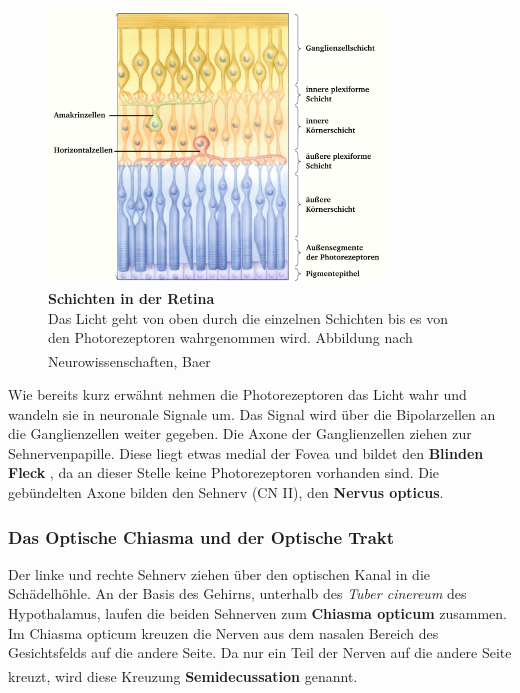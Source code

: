 \documentclass[12pt,a4paper,pdftex]{article}
\begin{document}
\begin{figure}[H]
    \centering
    \includegraphics[width = 0.8\textwidth]{pictures/visual/retina.png}
    \caption[Schichten in der Retina]{\textbf{Schichten in der Retina}\\
    Das Licht geht von oben durch die einzelnen Schichten bis es von den Photorezeptoren wahrgenommen wird. Abbildung nach Neurowissenschaften, Baer \textsuperscript{\cite[10]{neurowissenschaften_baer}}}
    \label{fig:retina}
\end{figure}

Wie bereits kurz erwähnt nehmen die Photorezeptoren das Licht wahr und wandeln sie in neuronale Signale um. Das Signal wird über die Bipolarzellen an die Ganglienzellen weiter gegeben. Die Axone der Ganglienzellen ziehen zur Sehnervenpapille. Diese liegt etwas medial der Fovea und bildet den \textbf{Blinden Fleck} , da an dieser Stelle keine Photorezeptoren vorhanden sind. Die gebündelten Axone bilden den Sehnerv (CN II), den \textbf{Nervus opticus}.  


\subsubsection*{Das Optische Chiasma und der Optische Trakt}


Der linke und rechte Sehnerv ziehen über den optischen Kanal in die Schädelhöhle. An der Basis des Gehirns, unterhalb des \textit{Tuber cinereum} des Hypothalamus, laufen die beiden Sehnerven zum \textbf{Chiasma opticum}  zusammen. 
Im Chiasma opticum kreuzen die Nerven aus dem nasalen Bereich des Gesichtsfelds auf die andere Seite. Da nur ein Teil der Nerven auf die andere Seite kreuzt, wird diese Kreuzung \textbf{Semidecussation}  genannt. \textsuperscript{\cite[15]{crossman2014neuroanatomy}} 
\end{document}
